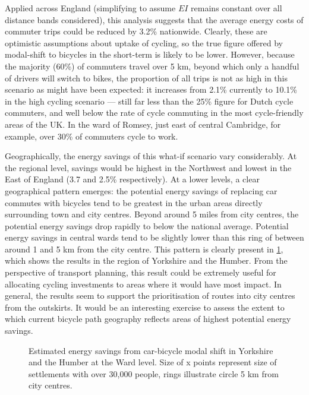 Applied across England (simplifying to assume $EI$ remains constant over all
distance bands considered), this analysis suggests that the average energy
costs of commuter trips could be reduced by 3.2\% nationwide. Clearly, these
are optimistic assumptions about uptake of cycling, so the true figure
offered by modal-shift to bicycles in the short-term is likely to be
lower. However, because the majority (60\%) of commuters travel
over 5 km, beyond which only a handful of drivers will switch to bikes, the
proportion of all trips is not as high in this scenario as might
have been expected: it increases from 2.1\% currently to 10.1\% in the high
cycling scenario --- still far less than the 25\% figure for Dutch cycle
commuters, and well below the rate of cycle commuting in the most cycle-friendly
areas of the UK. In the ward of Romsey, just east of central Cambridge, for
example, over 30\% of commuters cycle to work. 

Geographically, the energy savings of this what-if scenario vary considerably.
At the regional level, savings would be highest in the Northwest and lowest in
the East of England (3.7 and 2.5\% respectively).
At a lower levels, a clear geographical pattern emerges: the potential energy
savings of replacing car commutes with bicycles tend to be greatest in the
urban areas directly surrounding town and city centres. Beyond around 5 miles
from city centres, the potential energy savings drop rapidly to below the
national average. Potential energy savings in central wards tend to be slightly
lower than this ring of between around 1 and 5 km from the city centre.
This pattern is clearly present in \cref{fcysave}, which shows the results in
the region of Yorkshire and the Humber. From the perspective of transport
planning, this result could be extremely useful for allocating cycling
investments to areas where it would have most impact.
In general, the results seem to support the prioritisation of routes into
city centres from the outskirts. It would be an interesting exercise to assess
the extent to which current bicycle path geography reflects areas of highest
potential energy savings.

\begin{figure}
 \caption[Estimated energy savings from car-bicycle modal shift]{Estimated
energy savings from car-bicycle modal shift in Yorkshire and the Humber at the
Ward level. Size of x points represent size of settlements with over 30,000 people,
rings illustrate circle 5 km from city centres.} \label{fcysave}
\end{figure}

